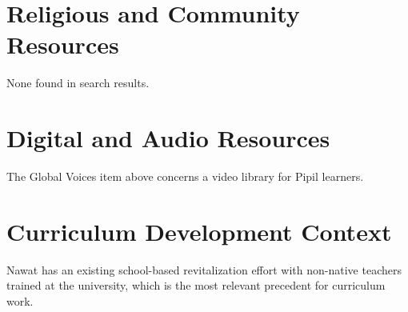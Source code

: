 \documentclass[12pt]{article}
\begin{document}
\section{Religious and Community Resources}
None found in search results.

\section{Digital and Audio Resources}
The Global Voices item above concerns a video library for Pipil learners.

\section{Curriculum Development Context}
Nawat has an existing school-based revitalization effort with non-native teachers trained at the university, which is the most relevant precedent for curriculum work.
\end{document}
